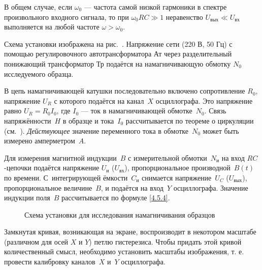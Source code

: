 В общем случае, если $\omega_0$ --- частота самой низкой гармоники в спектре произвольного
входного сигнала, то при $\omega_0 R C\gg1$ неравенство $U_{вых}\ll U_{вх}$ выполняется
на любой частоте $\omega>\omega_0$.







\experiment
 Схема установки изображена на рис.~.
Напряжение сети (220 В, 50 Гц) с помощью регулировочного автотрансформатора
$\text{Ат}$ через разделительный понижающий трансформатор $\text{Тр}$ подаётся
на намагничивающую обмотку $N_0$ исследуемого образца.

В цепь намагничивающей катушки последовательно включено сопротивление $R_0$,
напряжение $U_R$ с которого подаётся на канал~$X$ осциллографа.
Это напряжение равно $U_R=R_0I_0$, где $I_0$ --- ток в намагничивающей обмотке~$N_0$.
Связь напряжённости~$H$ в образце и тока~$I_0$ рассчитывается по теореме
о циркуляции (см.~).
\emph{Действующее} значение переменного тока в обмотке~$N_0$ может быть измерено
амперметром~$A$.

Для измерения магнитной индукции~$B$ с измерительной обмотки~$N_{и}$ на
вход $RC$-цепочки подаётся напряжение $U_{и}$ ($U_{вх}$),
пропорциональное производной~$B(t)$ по времени.
С~интегрирующей ёмкости~$C_{и}$ снимается напряжение~$U_C$ ($U_{вых}$),
пропорциональное величине~$B$, и подаётся на вход~$Y$ осциллографа.
Значение индукции поля~$B$ рассчитывается по формуле
\eqref{4.5.4}.

\begin{figure}[h!]
	\caption{Схема установки для исследования намагничивания образцов}
\end{figure}

Замкнутая кривая, возникающая на экране, воспроизводит в некотором масштабе
(различном для осей $X$ и $Y$) петлю гистерезиса. Чтобы придать этой кривой
количественный смысл, необходимо установить масштабы изображения, т. е. провести
калибровку каналов~$X$ и~$Y$ осциллографа.
%



